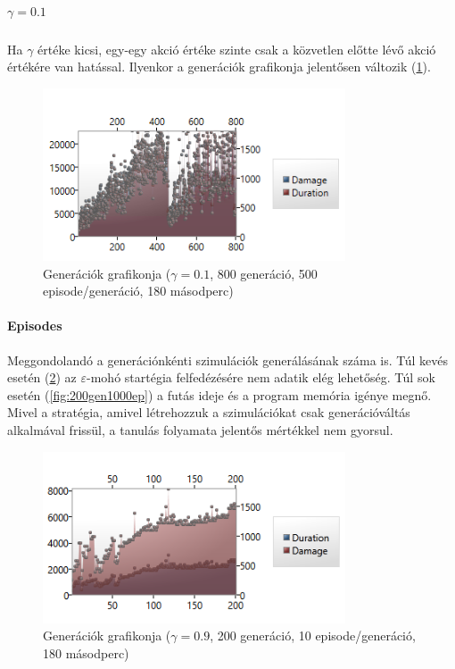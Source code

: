 \documentclass[12pt]{article}
\begin{document}
\subparagraph{$\gamma = 0.1$}

Ha $\gamma$ értéke kicsi, egy-egy akció értéke szinte csak a közvetlen előtte lévő akció értékére van hatással. Ilyenkor a generációk grafikonja jelentősen változik (\ref{fig:01gamma800gen500ep1800dur}). 

\begin{figure}[H]
	\begin{center}
		\includegraphics[width=0.8\textwidth]{01gamma800gen500ep1800dur}
	\end{center}
	\caption{Generációk grafikonja ($\gamma = 0.1$, 800 generáció, 500 episode/generáció, 180 másodperc)}
	\label{fig:01gamma800gen500ep1800dur}
\end{figure}

\paragraph{Episodes}

Meggondolandó a generációnkénti szimulációk generálásának száma is. Túl kevés esetén (\ref{fig:200gen10ep}) az $\varepsilon$-mohó startégia felfedézésére nem adatik elég lehetőség. Túl sok esetén (\ref{fig:200gen1000ep}) a futás ideje és a program memória igénye megnő. Mivel a stratégia, amivel létrehozzuk a szimulációkat csak generációváltás alkalmával frissül, a tanulás folyamata jelentős mértékkel nem gyorsul. 

\begin{figure}[H]
	\begin{center}
		\includegraphics[width=0.8\textwidth]{200gen10ep}
	\end{center}
	\caption{Generációk grafikonja ($\gamma = 0.9$, 200 generáció, 10 episode/generáció, 180 másodperc)}
	\label{fig:200gen10ep}
\end{figure}
\end{document}
